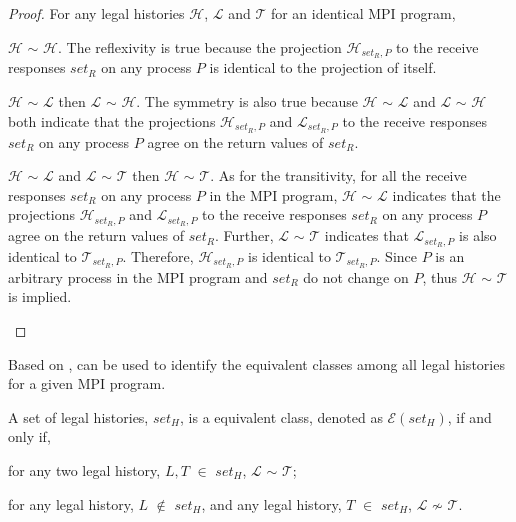 \begin{proof}
For any legal histories $\mathcal{H}$, $\mathcal{L}$ and $\mathcal{T}$ for an identical MPI program,
\begin{compactenum}
\item $\mathcal{H}$ $\sim$ $\mathcal{H}$. The reflexivity is true because the projection $\mathcal{H}_{\mathit{set_R},P}$ to the receive responses $\mathit{set_R}$ on any process $P$ is identical to the projection of itself.
\item $\mathcal{H}$ $\sim$ $\mathcal{L}$ then $\mathcal{L}$ $\sim$ $\mathcal{H}$. The symmetry is also true because $\mathcal{H}$ $\sim$ $\mathcal{L}$ and $\mathcal{L}$ $\sim$ $\mathcal{H}$ both indicate that the projections $\mathcal{H}_{\mathit{set_R},P}$ and $\mathcal{L}_{\mathit{set_R},P}$ to the receive responses $\mathit{set_R}$ on any process $P$ agree on the return values of $\mathit{set_R}$. 
\item $\mathcal{H}$ $\sim$ $\mathcal{L}$ and $\mathcal{L}$ $\sim$ $\mathcal{T}$ then $\mathcal{H}$ $\sim$ $\mathcal{T}$. As for the transitivity, for all the receive responses $\mathit{set_R}$ on any process $P$ in the MPI program, $\mathcal{H}$ $\sim$ $\mathcal{L}$ indicates that the projections $\mathcal{H}_{\mathit{set_R},P}$ and $\mathcal{L}_{\mathit{set_R},P}$ to the receive responses $\mathit{set_R}$ on any process $P$ agree on the return values of $\mathit{set_R}$. Further, $\mathcal{L}$ $\sim$ $\mathcal{T}$ indicates that $\mathcal{L}_{\mathit{set_R},P}$ is also identical to $\mathcal{T}_{\mathit{set_R},P}$. Therefore, $\mathcal{H}_{\mathit{set_R},P}$ is identical to $\mathcal{T}_{\mathit{set_R},P}$. Since $P$ is an arbitrary process in the MPI program and $\mathit{set_R}$ do not change on $P$, thus $\mathcal{H}$ $\sim$ $\mathcal{T}$ is implied.
\end{compactenum}
\end{proof}

Based on ,  can be used to identify the equivalent classes among all legal histories for a given MPI program. 

\begin{definition}\label{def:equal_class}
A set of legal histories, $\mathit{set_H}$, is a equivalent class, denoted as $\mathcal{E}$$(\mathit{set_H})$, if and only if,
\begin{compactenum}
\item for any two legal history, $L,T$ $\in$ $\mathit{set_H}$, $\mathcal{L}$ $\sim$ $\mathcal{T}$;
\item for any legal history, $L$ $\notin$ $\mathit{set_H}$, and any legal history, $T$ $\in$ $\mathit{set_H}$, $\mathcal{L}$ $\not\sim$ $\mathcal{T}$.
\end{compactenum}
\end{definition}

